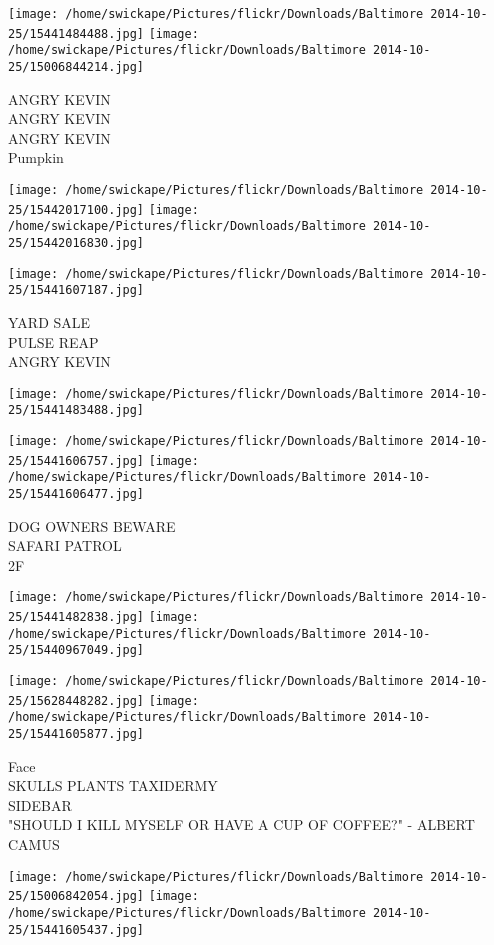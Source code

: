 \documentclass[10pt,letterpaper]{article}
\begin{document}
\texttt{[image: /home/swickape/Pictures/flickr/Downloads/Baltimore 2014-10-25/15441484488.jpg]}
\texttt{[image: /home/swickape/Pictures/flickr/Downloads/Baltimore 2014-10-25/15006844214.jpg]}

ANGRY KEVIN\\
ANGRY KEVIN\\
ANGRY KEVIN\\
Pumpkin
\pagebreak

\texttt{[image: /home/swickape/Pictures/flickr/Downloads/Baltimore 2014-10-25/15442017100.jpg]}
\texttt{[image: /home/swickape/Pictures/flickr/Downloads/Baltimore 2014-10-25/15442016830.jpg]}

\vspace{0.25in}
\texttt{[image: /home/swickape/Pictures/flickr/Downloads/Baltimore 2014-10-25/15441607187.jpg]}

YARD SALE\\
PULSE REAP\\
ANGRY KEVIN
\pagebreak

\texttt{[image: /home/swickape/Pictures/flickr/Downloads/Baltimore 2014-10-25/15441483488.jpg]}

\vspace{0.25in}
\texttt{[image: /home/swickape/Pictures/flickr/Downloads/Baltimore 2014-10-25/15441606757.jpg]}
\texttt{[image: /home/swickape/Pictures/flickr/Downloads/Baltimore 2014-10-25/15441606477.jpg]}

DOG OWNERS BEWARE\\
SAFARI PATROL\\
2F
\pagebreak

\texttt{[image: /home/swickape/Pictures/flickr/Downloads/Baltimore 2014-10-25/15441482838.jpg]}
\texttt{[image: /home/swickape/Pictures/flickr/Downloads/Baltimore 2014-10-25/15440967049.jpg]}

\texttt{[image: /home/swickape/Pictures/flickr/Downloads/Baltimore 2014-10-25/15628448282.jpg]}
\texttt{[image: /home/swickape/Pictures/flickr/Downloads/Baltimore 2014-10-25/15441605877.jpg]}

Face\\
SKULLS PLANTS TAXIDERMY\\
SIDEBAR\\
"SHOULD I KILL MYSELF OR HAVE A CUP OF COFFEE?" {-} ALBERT CAMUS
\pagebreak

\texttt{[image: /home/swickape/Pictures/flickr/Downloads/Baltimore 2014-10-25/15006842054.jpg]}
\texttt{[image: /home/swickape/Pictures/flickr/Downloads/Baltimore 2014-10-25/15441605437.jpg]}
\end{document}
